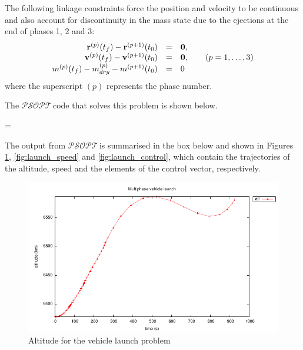\documentclass[a4paper,11pt]{report}    %
\newcommand{\psopt}{$\mathcal{PSOPT}$\,}  %
\newenvironment{shadedframe}{%
  \def\FrameCommand{\fcolorbox{black}{shadecolor}}%
  \MakeFramed {\FrameRestore}}
{\endMakeFramed}
\begin{document}
The following linkage  constraints force the position and velocity to be continuous and also account for discontinuity in the mass state due to the  ejections at the end of phases 1, 2 and 3:
\begin{equation}
\begin{array}{rcl}
{\bf r}^{(p)}(t_f)-{\bf r}^{(p+1)}(t_0) &=& {\bf 0}, \\
{\bf v}^{(p)}(t_f)-{\bf v}^{(p+1)}(t_0) &=& {\bf 0}, \qquad (p=1,\ldots,3)\\
m^{(p)}(t_f)-m_{dry}^{(p)}-m^{(p+1)}(t_0) &=& 0 \\
\end{array}
\end{equation}
where the superscript $(p)$ represents the phase number.


The
\psopt code that solves this problem is shown below. 

\tiny
\begin{shadedframe}
=
\end{shadedframe}
\normalsize

The output from \psopt is summarised in the box below and shown in Figures \ref{fig:launch_altitude}, \ref{fig:launch_speed} and \ref{fig:launch_control}, which contain the trajectories of the altitude, speed and the elements of the control vector, respectively.

\begin{shadedframe}

\end{shadedframe}

\begin{figure}
  \centering 
  \includegraphics{../examples/launch/launch_altitude}
  \caption{Altitude for the vehicle launch problem}
 \label{fig:launch_altitude}
\end{figure}
\end{document}
